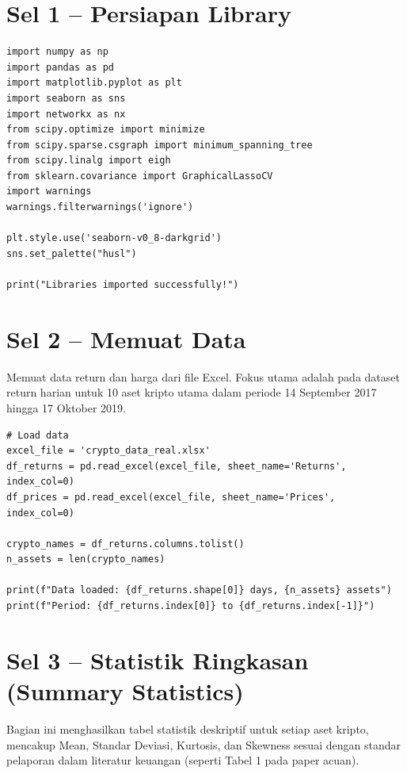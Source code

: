 \documentclass[12pt,a4paper]{article}
\begin{document}
\section{Sel 1 -- Persiapan Library}
\begin{lstlisting}[caption={Import libraries dan konfigurasi visualisasi}]
import numpy as np
import pandas as pd
import matplotlib.pyplot as plt
import seaborn as sns
import networkx as nx
from scipy.optimize import minimize
from scipy.sparse.csgraph import minimum_spanning_tree
from scipy.linalg import eigh
from sklearn.covariance import GraphicalLassoCV
import warnings
warnings.filterwarnings('ignore')

plt.style.use('seaborn-v0_8-darkgrid')
sns.set_palette("husl")

print("Libraries imported successfully!")
\end{lstlisting}

\section{Sel 2 -- Memuat Data}
Memuat data return dan harga dari file Excel. Fokus utama adalah pada dataset return harian untuk 10 aset kripto utama dalam periode 14 September 2017 hingga 17 Oktober 2019.

\begin{lstlisting}[caption={Load dataset kripto}]
# Load data
excel_file = 'crypto_data_real.xlsx'
df_returns = pd.read_excel(excel_file, sheet_name='Returns', index_col=0)
df_prices = pd.read_excel(excel_file, sheet_name='Prices', index_col=0)

crypto_names = df_returns.columns.tolist()
n_assets = len(crypto_names)

print(f"Data loaded: {df_returns.shape[0]} days, {n_assets} assets")
print(f"Period: {df_returns.index[0]} to {df_returns.index[-1]}")
\end{lstlisting}

\section{Sel 3 -- Statistik Ringkasan (Summary Statistics)}
Bagian ini menghasilkan tabel statistik deskriptif untuk setiap aset kripto, mencakup Mean, Standar Deviasi, Kurtosis, dan Skewness sesuai dengan standar pelaporan dalam literatur keuangan (seperti Tabel 1 pada paper acuan).
\end{document}

